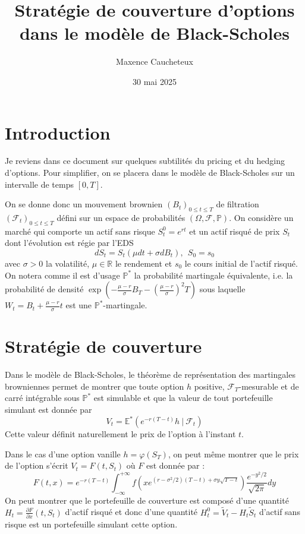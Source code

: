 \documentclass[12pt]{article}
\title{Stratégie de couverture d'options dans le modèle de Black-Scholes}
\author{Maxence Caucheteux}
\date{30 mai 2025}
\newcommand{\E}{\mathbb{E}}
\newcommand{\prob}{\mathbb{P}}
\newcommand{\f}{\mathcal{F}}
\begin{document}
\maketitle

\section{Introduction}
Je reviens dans ce document sur quelques subtilités du pricing et du hedging d'options. Pour simplifier, on se placera dans le modèle de Black-Scholes sur un intervalle de temps $[0,T]$. 

On se donne donc un mouvement brownien $(B_t)_{0 \leq t \leq T}$ de filtration $(\f_t)_{0 \leq t\leq T}$ défini sur un espace de probabilités $(\Omega, \f, \prob)$. On considère un marché qui comporte un actif sans risque $S^0_t = e^{rt}$ et un actif risqué de prix $S_t$ dont l'évolution est régie par l'EDS
$$dS_t = S_t (\mu dt + \sigma dB_t), \ \ S_0=s_0$$
avec $\sigma > 0$ la volatilité, $\mu \in \mathbb{R}$ le rendement et $s_0$ le cours initial de l'actif risqué. On notera comme il est d'usage $\prob^*$ la probabilité martingale équivalente, i.e. la probabilité de densité $\exp\left(-\frac{\mu-r}{\sigma}B_T-(\frac{\mu-r}{\sigma})^2T\right)$ sous laquelle $W_t = B_t + \frac{\mu-r}{\sigma}t$ est une $\prob^*$-martingale.

\section{Stratégie de couverture}
Dans le modèle de Black-Scholes, le théorème de représentation des martingales browniennes permet de montrer que toute option $h$ positive, $\f_T$-mesurable et de carré intégrable sous $\prob^*$ est simulable et que la valeur de tout portefeuille simulant est donnée par 
$$V_t = \E^*(e^{-r(T-t)}h \ | \ \f_t)$$
Cette valeur définit naturellement le prix de l'option à l'instant $t$. 

Dans le cas d'une option vanille $h=\varphi(S_T)$, on peut même montrer que le prix de l'option s'écrit $V_t=F(t, S_t)$ où $F$ est donnée par :
$$F(t,x) = e^{-r(T-t)}\int_{-\infty}^{+\infty} f\left( xe^{(r-\sigma^2/2)(T-t) + \sigma y \sqrt{T-t}} \right) \frac{e^{-y^2/2}}{\sqrt{2\pi}}dy$$
On peut montrer que le portefeuille de couverture est composé d'une quantité $H_t = \frac{\partial F}{\partial x}(t, S_t)$ d'actif risqué et donc d'une quantité $H^0_t = \tilde{V}_t - H_t\tilde{S}_t$ d'actif sans risque est un portefeuille simulant cette option.
\end{document}
